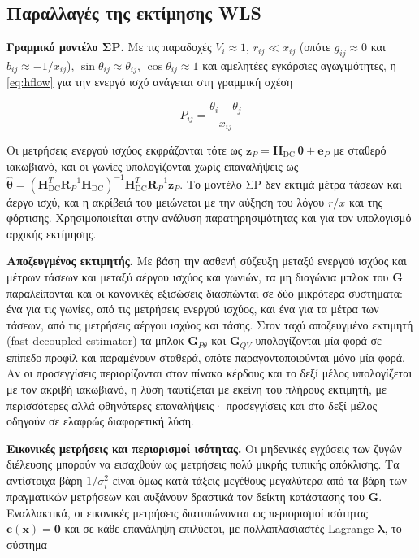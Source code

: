 \subsection{Παραλλαγές της εκτίμησης WLS}

\textbf{Γραμμικό μοντέλο ΣΡ.} Με τις παραδοχές $V_i \approx 1$, $r_{ij} \ll x_{ij}$ (οπότε
$g_{ij} \approx 0$ και $b_{ij} \approx -1/x_{ij}$), $\sin\theta_{ij} \approx \theta_{ij}$,
$\cos\theta_{ij} \approx 1$ και αμελητέες εγκάρσιες αγωγιμότητες, η \eqref{eq:hflow} για την
ενεργό ισχύ ανάγεται στη γραμμική σχέση

\begin{equation}
P_{ij} = \frac{\theta_i - \theta_j}{x_{ij}}
\label{eq:dcflow}
\end{equation}

Οι μετρήσεις ενεργού ισχύος εκφράζονται τότε ως $\mathbf{z}_P = \mathbf{H}_{\mathrm{DC}}\,
\boldsymbol{\theta} + \mathbf{e}_P$ με σταθερό ιακωβιανό, και οι γωνίες υπολογίζονται χωρίς
επαναλήψεις ως $\hat{\boldsymbol{\theta}} = (\mathbf{H}_{\mathrm{DC}}^{T}\mathbf{R}_P^{-1}
\mathbf{H}_{\mathrm{DC}})^{-1}\mathbf{H}_{\mathrm{DC}}^{T}\mathbf{R}_P^{-1}\mathbf{z}_P$. Το
μοντέλο ΣΡ δεν εκτιμά μέτρα τάσεων και άεργο ισχύ, και η ακρίβειά του μειώνεται με την αύξηση
του λόγου $r/x$ και της φόρτισης. Χρησιμοποιείται στην ανάλυση παρατηρησιμότητας και για
τον υπολογισμό αρχικής εκτίμησης.

\textbf{Αποζευγμένος εκτιμητής.} Με βάση την ασθενή σύζευξη μεταξύ ενεργού ισχύος και μέτρων
τάσεων και μεταξύ αέργου ισχύος και γωνιών, τα μη διαγώνια μπλοκ του $\mathbf{G}$ παραλείπονται
και οι κανονικές εξισώσεις διασπώνται σε δύο μικρότερα συστήματα: ένα για τις γωνίες, από
τις μετρήσεις ενεργού ισχύος, και ένα για τα μέτρα των τάσεων, από τις μετρήσεις αέργου
ισχύος και τάσης. Στον ταχύ αποζευγμένο εκτιμητή (fast decoupled estimator) τα μπλοκ
$\mathbf{G}_{P\theta}$ και $\mathbf{G}_{QV}$ υπολογίζονται μία φορά σε επίπεδο προφίλ και
παραμένουν σταθερά, οπότε παραγοντοποιούνται μόνο μία φορά. Αν οι προσεγγίσεις περιορίζονται
στον πίνακα κέρδους και το δεξί μέλος υπολογίζεται με τον ακριβή ιακωβιανό, η λύση ταυτίζεται
με εκείνη του πλήρους εκτιμητή, με περισσότερες αλλά φθηνότερες επαναλήψεις· προσεγγίσεις και
στο δεξί μέλος οδηγούν σε ελαφρώς διαφορετική λύση.

\textbf{Εικονικές μετρήσεις και περιορισμοί ισότητας.} Οι μηδενικές εγχύσεις των ζυγών
διέλευσης μπορούν να εισαχθούν ως μετρήσεις πολύ μικρής τυπικής απόκλισης. Τα αντίστοιχα βάρη
$1/\sigma_i^2$ είναι όμως κατά τάξεις μεγέθους μεγαλύτερα από τα βάρη των πραγματικών
μετρήσεων και αυξάνουν δραστικά τον δείκτη κατάστασης του $\mathbf{G}$. Εναλλακτικά, οι
εικονικές μετρήσεις διατυπώνονται ως περιορισμοί ισότητας $\mathbf{c}(\mathbf{x}) = \mathbf{0}$
και σε κάθε επανάληψη επιλύεται, με πολλαπλασιαστές Lagrange $\boldsymbol{\lambda}$, το σύστημα

